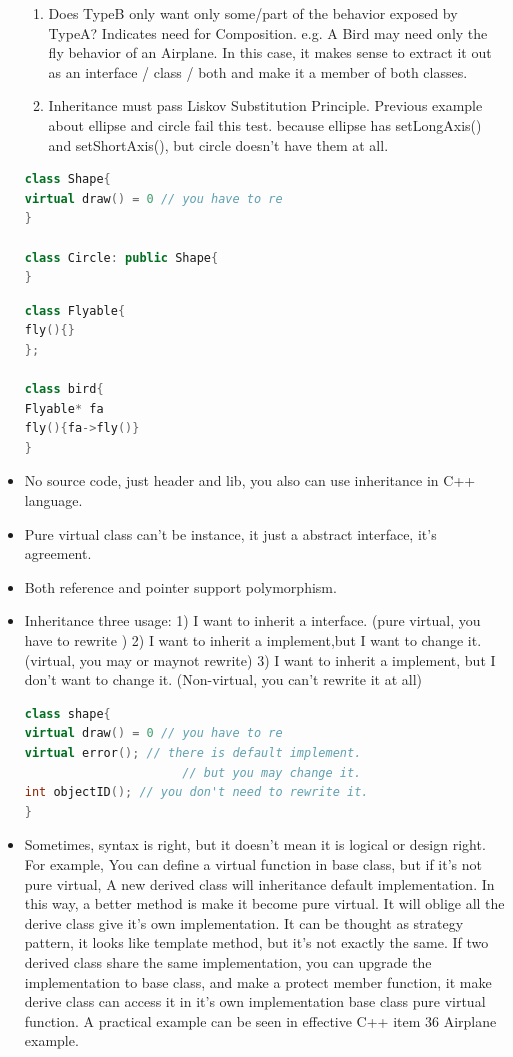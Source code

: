 \documentclass[a4paper,12pt,twoside]{book}
\begin{document}
\begin{itemize}
\begin{enumerate}
\item Does TypeB only want only some/part of the behavior exposed by TypeA? Indicates need for Composition. e.g. A Bird may need only the fly behavior of an Airplane. In this case, it makes sense to extract it out as an interface / class / both and make it a member of both classes.

\item Inheritance must pass Liskov Substitution Principle. Previous example about ellipse and circle fail this test. because ellipse has setLongAxis() and setShortAxis(), but circle doesn't have them at all.
\end{enumerate}
\begin{lstlisting}[frame=single, language=c++]
class Shape{
virtual draw() = 0 // you have to re
}

class Circle: public Shape{
}
\end{lstlisting}

\begin{lstlisting}[frame=single, language=c++]
class Flyable{
fly(){}
};

class bird{
Flyable* fa
fly(){fa->fly()}
}
\end{lstlisting}

\item No source code, just header and lib, you also can use inheritance in C++ language.

\item Pure virtual class can't be instance, it just a abstract interface, it's agreement.

\item Both reference and pointer support polymorphism.

\item Inheritance three usage: 1) I want to inherit a interface. (pure virtual, you have to rewrite ) 2) I want to inherit a implement,but I want to change it. (virtual, you may or maynot rewrite) 3) I want to inherit a implement, but I don't want to change it. (Non-virtual, you can't rewrite it at all)
\begin{lstlisting}[frame=single, language=c++]
class shape{
virtual draw() = 0 // you have to re
virtual error(); // there is default implement.
                      // but you may change it.
int objectID(); // you don't need to rewrite it.
}
\end{lstlisting}

\item Sometimes,  syntax is right, but it doesn't mean it is logical  or design right. For example,  You can define a  virtual function in base class, but if it's not pure virtual, A new derived class will inheritance default implementation.  In this way, a better method is make it become pure virtual.  It will oblige all the derive class give it's own  implementation. It can be thought as strategy pattern, it looks like template method, but it's not exactly the same.  If two derived class share the same  implementation, you can upgrade the implementation to base class, and make a protect member function, it make derive class can access it in it's own implementation base class pure virtual function. A practical example can be seen in effective C++ item 36 Airplane example.



\end{itemize}
\end{document}
